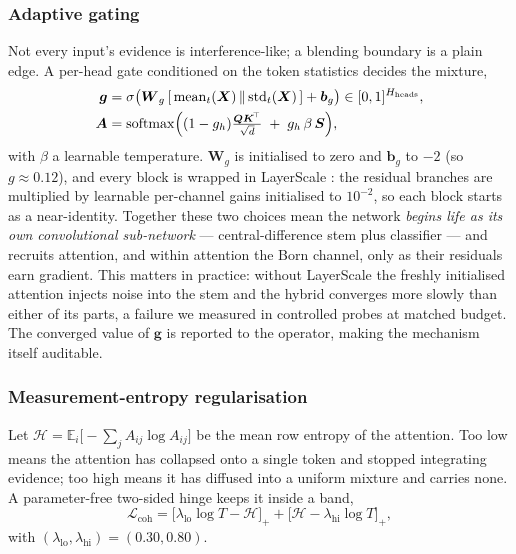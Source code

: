 \documentclass[conference]{IEEEtran}
\newcommand{\bs}[1]{\boldsymbol{#1}}
\begin{document}
\subsubsection{Adaptive gating}
Not every input's evidence is interference-like; a blending boundary is a plain
edge. A per-head gate conditioned on the token statistics decides the mixture,
\begin{align}
\bs{g} &= \sigma\bigl(\bs{W}_{g}\,[\,\mathrm{mean}_t(\bs{X}) \,\Vert\, \mathrm{std}_t(\bs{X})\,] + \bs{b}_{g}\bigr) \in [0,1]^{H_{\text{heads}}},\\
\bs{A} &= \mathrm{softmax}\Bigl( (1-g_{h})\tfrac{\bs{Q}\bs{K}^{\!\top}}{\sqrt{d}} \;+\; g_{h}\,\beta\, \bs{S} \Bigr),
\label{eq:gate}
\end{align}
with $\beta$ a learnable temperature. $\bs{W}_{g}$ is initialised to zero and
$\bs{b}_{g}$ to $-2$ (so $g\!\approx\!0.12$), and every block is wrapped in
LayerScale \cite{touvron2021cait}: the residual branches are multiplied by
learnable per-channel gains initialised to $10^{-2}$, so each block starts as a
near-identity. Together these two choices mean the network \emph{begins life as
its own convolutional sub-network} --- central-difference stem plus classifier ---
and recruits attention, and within attention the Born channel, only as their
residuals earn gradient. This matters in practice: without LayerScale the freshly
initialised attention injects noise into the stem and the hybrid converges more
slowly than either of its parts, a failure we measured in controlled probes at
matched budget. The converged value of $\bs{g}$ is reported to the operator,
making the mechanism itself auditable.

\subsubsection{Measurement-entropy regularisation}
Let $\mathcal{H}=\mathbb{E}_{i}\bigl[-\sum_{j}A_{ij}\log A_{ij}\bigr]$ be the mean
row entropy of the attention. Too low means the attention has collapsed onto a
single token and stopped integrating evidence; too high means it has diffused into a
uniform mixture and carries none. A parameter-free two-sided hinge keeps it inside a
band,
\begin{equation}
\mathcal{L}_{\text{coh}} = \bigl[\lambda_{\text{lo}}\log T - \mathcal{H}\bigr]_{+}
+ \bigl[\mathcal{H} - \lambda_{\text{hi}}\log T\bigr]_{+},
\end{equation}
with $(\lambda_{\text{lo}},\lambda_{\text{hi}})=(0.30,0.80)$.
\end{document}

